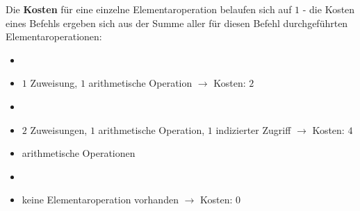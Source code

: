 Die \textbf{Kosten} für eine einzelne Elementaroperation belaufen sich auf $1$ - die Kosten eines Befehls ergeben sich aus der Summe aller für diesen Befehl durchgeführten Elementaroperationen:


\begin{itemize}
    \item {}
    \item[] $1$ Zuweisung, $1$ arithmetische Operation $\rightarrow$ Kosten: $2$
    \item {}
    \item[] $2$ Zuweisungen, $1$ arithmetische Operation, $1$ indizierter Zugriff $\rightarrow$ Kosten: $4$
    \item arithmetische Operationen 
    \item {}
    \item[] keine Elementaroperation vorhanden $\rightarrow$ Kosten: $0$
\end{itemize}


